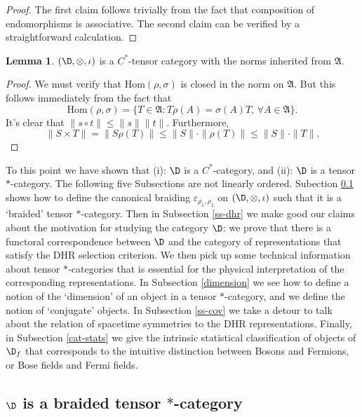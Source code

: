 \documentclass[12pt]{article}
\newcommand{\alg}[1]{\mathfrak{#1}}
\newcommand{\norm}[1]{\| #1\|}
\theoremstyle{definition}
\newtheorem{lemma}[thm]{Lemma}
\theoremstyle{definition}
\theoremstyle{remark}
\newcommand{\ve}{\varepsilon}
\newcommand{\Hom}{\mathrm{Hom}}
\begin{document}
\begin{proof} The first claim follows trivially from the fact that composition of
  endomorphisms is associative.  The second claim can be verified by a
  straightforward calculation.  \end{proof}


\begin{lemma} $(\D ,\otimes ,\iota )$ is a $C^*$-tensor category with the norms
  inherited from $\alg{A}$. \end{lemma}

\begin{proof} We must verify that $\Hom (\rho ,\sigma )$ is closed in the norm on
  $\alg{A}$.  But this follows immediately from the fact that 
$$ \Hom (\rho ,\sigma )= \{ T\in \alg{A}:T\rho (A)=\sigma (A)T ,\, \forall A\in
\alg{A} \} .$$ 
It's clear that $\norm{s\circ t}\leq \norm{s}\norm{t}$.  Furthermore,
$$ \norm{S\times T}=\norm{S\rho (T)}\leq \norm{S}\cdot \norm{\rho (T)}\leq
\norm{S}\cdot \norm{T} .$$
\end{proof}

To this point we have shown that (i): $\D$ is a $C^*$-category, and
(ii): $\D$ is a tensor $*$-category.  The following five Subsections
are not linearly ordered.  Subection \ref{braided} shows how to define
the canonical braiding $\ve _{\rho _1,\rho _2}$ on $(\D ,\otimes
,\iota )$ such that it is a `braided' tensor $*$-category.  Then in
Subsection \ref{ss-dhr} we make good our claims about the motivation
for studying the category $\D$: we prove that there is a functoral
correspondence between $\D$ and the category of representations that
satisfy the DHR selection criterion.  We then pick up some technical
information about tensor $*$-categories that is essential for the
physical interpretation of the corresponding representations.  In
Subsection \ref{dimension} we see how to define a notion of the
`dimension' of an object in a tensor $*$-category, and we define the
notion of `conjugate' objects.  In Subsection \ref{ss-cov} we take a
detour to talk about the relation of spacetime symmetries to the DHR
representations.  Finally, in Subsection \ref{cat-stats} we give the
intrinsic statistical classification of objects of $\D _f$ that
corresponds to the intuitive distinction between Bosons and Fermions,
or Bose fields and Fermi fields.



\subsection{$\D$ is a braided tensor $*$-category}
\label{braided}
\end{document}
